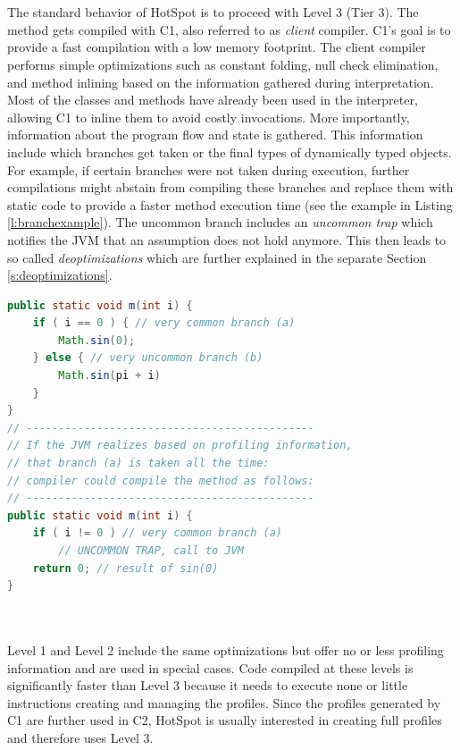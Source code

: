 \\\\
The standard behavior of HotSpot is to proceed with Level 3 (Tier 3). The method gets compiled with C1, also referred to as \textit{client} compiler.
C1's goal is to provide a fast compilation with a low memory footprint.
The client compiler performs simple optimizations such as constant folding, null check elimination, and method inlining based on the information gathered during interpretation. 
Most of the classes and methods have already been used in the interpreter, allowing C1 to inline them to avoid costly invocations.
More importantly, information about the program flow and state is gathered. This information include which branches get taken or the final types of dynamically typed objects. 
For example, if certain branches were not taken during execution, further compilations might abstain from compiling these branches and replace them with static code to provide a faster method execution time (see the example in Listing \ref{l:branchexample}). The uncommon branch includes an \textit{uncommon trap} which notifies the JVM that an assumption does not hold anymore. This then leads to so called \textit{deoptimizations} which are further explained in the separate Section \ref{s:deoptimizations}.
\begin{lstlisting}[float,caption=Example that shows potential compilation based on profiling information,label=l:branchexample,language=Java]
public static void m(int i) {
    if ( i == 0 ) { // very common branch (a)
        Math.sin(0);
    } else { // very uncommon branch (b)
        Math.sin(pi + i)
    }
}
// ---------------------------------------------
// If the JVM realizes based on profiling information,
// that branch (a) is taken all the time:
// compiler could compile the method as follows:
// ---------------------------------------------
public static void m(int i) {
    if ( i != 0 ) // very common branch (a)
        // UNCOMMON TRAP, call to JVM
    return 0; // result of sin(0)
}
\end{lstlisting}
\\\\
Level 1 and Level 2 include the same optimizations but offer no or less profiling information and are used in special cases. Code compiled at these levels is significantly faster than Level 3 because it needs to execute none or little instructions creating and managing the profiles. Since the profiles generated by C1 are further used in C2, HotSpot is usually interested in creating full profiles and therefore uses Level 3.
